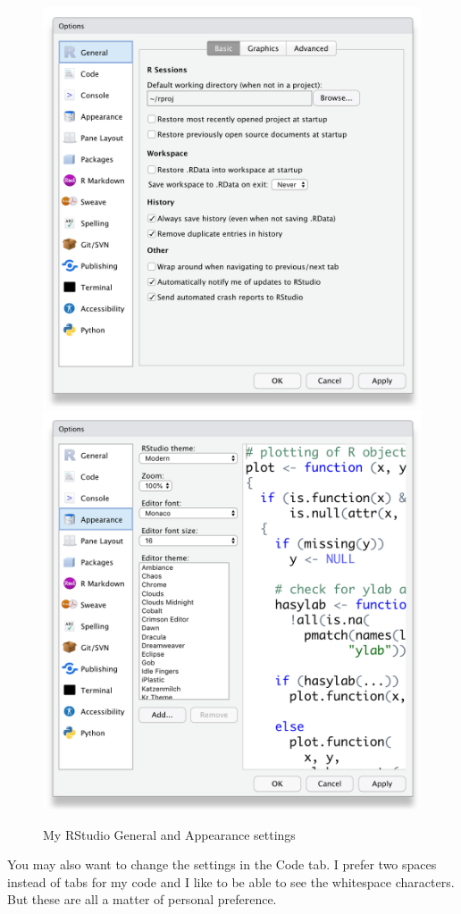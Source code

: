 \documentclass[
  oneside]{book}
\begin{document}
\begin{figure}

{\centering \includegraphics[width=0.45\linewidth]{images/rstudio_settings_general} \includegraphics[width=0.45\linewidth]{images/rstudio_settings_appearance} 

}

\caption{My RStudio General and Appearance settings}\label{fig:settings-general}
\end{figure}

You may also want to change the settings in the Code tab. I prefer two spaces instead of tabs for my code and I like to be able to see the whitespace characters. But these are all a matter of personal preference.
\end{document}
